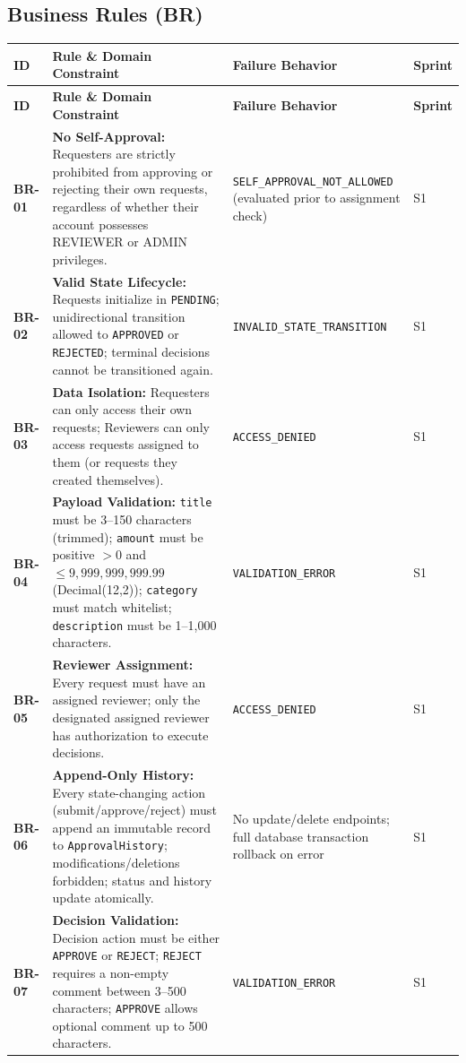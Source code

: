 \documentclass[11pt,a4paper]{article}
\begin{document}
\subsection{Business Rules (BR)}

\vspace{0.3em}
\begin{longtable}{|>{\RaggedRight}p{1.5cm}|>{\RaggedRight}p{7.0cm}|>{\RaggedRight}p{4.6cm}|>{\centering\arraybackslash}p{1.6cm}|}
\hline
\rowcolor{zenPale}\textbf{ID} & \textbf{Rule \& Domain Constraint} & \textbf{Failure Behavior} & \textbf{Sprint} \\ \hline
\endfirsthead
\hline
\rowcolor{zenPale}\textbf{ID} & \textbf{Rule \& Domain Constraint} & \textbf{Failure Behavior} & \textbf{Sprint} \\ \hline
\endhead
\hline
\endfoot
\textbf{BR-01} & \textbf{No Self-Approval:} Requesters are strictly prohibited from approving or rejecting their own requests, regardless of whether their account possesses REVIEWER or ADMIN privileges. & 403 \texttt{SELF\_\allowbreak APPROVAL\_\allowbreak NOT\_\allowbreak ALLOWED} (evaluated prior to assignment check) & S1 \\ \hline
\textbf{BR-02} & \textbf{Valid State Lifecycle:} Requests initialize in \texttt{PENDING}; unidirectional transition allowed to \texttt{APPROVED} or \texttt{REJECTED}; terminal decisions cannot be transitioned again. & 400 \texttt{INVALID\_\allowbreak STATE\_\allowbreak TRANSITION} & S1 \\ \hline
\textbf{BR-03} & \textbf{Data Isolation:} Requesters can only access their own requests; Reviewers can only access requests assigned to them (or requests they created themselves). & 403 \texttt{ACCESS\_\allowbreak DENIED} & S1 \\ \hline
\textbf{BR-04} & \textbf{Payload Validation:} \texttt{title} must be 3--150 characters (trimmed); \texttt{amount} must be positive $> 0$ and $\le 9,999,999,999.99$ (Decimal(12,2)); \texttt{category} must match whitelist; \texttt{description} must be 1--1,000 characters. & 400 \texttt{VALIDATION\_\allowbreak ERROR} & S1 \\ \hline
\textbf{BR-05} & \textbf{Reviewer Assignment:} Every request must have an assigned reviewer; only the designated assigned reviewer has authorization to execute decisions. & 403 \texttt{ACCESS\_\allowbreak DENIED} & S1 \\ \hline
\textbf{BR-06} & \textbf{Append-Only History:} Every state-changing action (submit/approve/reject) must append an immutable record to \texttt{ApprovalHistory}; modifications/deletions forbidden; status and history update atomically. & No update/delete endpoints; full database transaction rollback on error & S1 \\ \hline
\textbf{BR-07} & \textbf{Decision Validation:} Decision action must be either \texttt{APPROVE} or \texttt{REJECT}; \texttt{REJECT} requires a non-empty comment between 3--500 characters; \texttt{APPROVE} allows optional comment up to 500 characters. & 400 \texttt{VALIDATION\_\allowbreak ERROR} & S1 \\ \hline
\end{longtable}
\vspace{0.3em}
\end{document}
